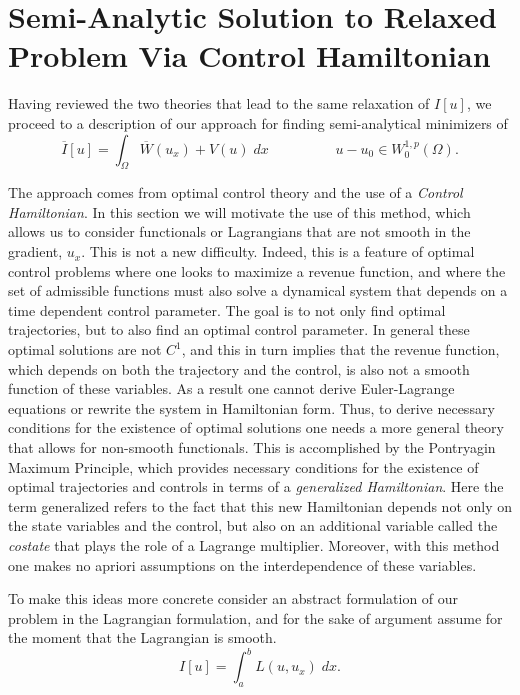 \documentclass[11pt]{article}
\theoremstyle{plain}
\begin{document}
\section{Semi-Analytic Solution to Relaxed Problem Via Control Hamiltonian}\label{s:controlH}

Having reviewed the two theories that lead to the same relaxation of $I[u]$, we proceed to a description of our approach for finding semi-analytical minimizers of
\[ \overline{I}[u] = \int_\Omega \overline{W}(u_x) + V(u) \;dx \hspace{2cm} u-u_0 \in W^{1,p}_0(\Omega). \] 

 The approach comes from optimal control theory and the use of a {\it Control Hamiltonian}. In this section we will motivate the use of this method, which allows us to consider functionals or Lagrangians that are not smooth in the gradient, $u_x$. This is not a new difficulty. Indeed, this is a feature of optimal control problems where one looks to maximize a revenue function, and where the set of admissible functions must also solve a dynamical system that depends on a time dependent control parameter. The goal is to not only find optimal trajectories, but to also find an optimal control parameter. In general these optimal solutions are not $C^1$, and this in turn implies that the revenue function, which depends on both the trajectory and the control, is also not a smooth function of these variables. As a result one cannot derive Euler-Lagrange equations or rewrite the system in Hamiltonian form.  Thus, to derive necessary conditions for the existence of optimal solutions one needs a more general theory that allows for non-smooth functionals. This is accomplished by the Pontryagin Maximum Principle, which provides necessary conditions for the existence of optimal trajectories and controls in terms of a {\it generalized Hamiltonian}. Here the term generalized refers to the fact that this new Hamiltonian depends not only on the state variables and the control, but also on an additional variable called the {\it costate} that plays the role of a Lagrange multiplier. Moreover, with this method one makes no apriori  assumptions on the interdependence of these variables.


To make this ideas more concrete consider an abstract formulation of our problem in the Lagrangian  formulation, and for the sake of argument assume for the moment that the Lagrangian is smooth. 
\begin{equation}\label{e:minimization}
 I[u] =  \int_a^b L(u,u_x) \;dx. 
 \end{equation}
\end{document}
